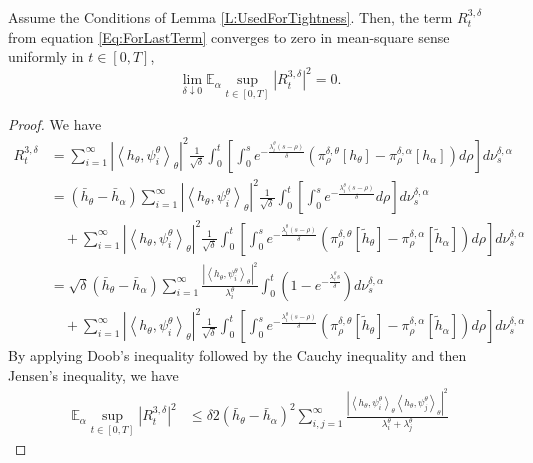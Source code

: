\documentclass{article}
\begin{document}
\begin{lemma}
\label{L:R3convergence}
Assume the Conditions of Lemma \ref{L:UsedForTightness}.
Then, the term $R^{3,\delta}_t$ from equation \eqref{Eq:ForLastTerm} converges to zero in mean-square sense uniformly in $t\in[0,T]$,
\[\lim_{\delta\downarrow 0}\mathbb{E}_{\alpha}\sup_{t\in[0,T]}\left|R^{3,\delta}_{t}\right|^{2}=0.\]
\end{lemma}
\begin{proof}
 We have
\begin{align}
R^{3,\delta}_{t}&=\sum_{i=1}^{\infty}\left|\left<h_{\theta},\psi_i^{\theta}\right>_{\theta}\right|^{2}\frac{1}{\sqrt\delta}\int_{0}^{t}\left[\int_0^s e^{-\frac{\lambda_i^{\theta}(s-\rho)}{\delta}}\left(\pi_\rho^{\delta,\theta}[h_{\theta}]-\pi_\rho^{\delta,\alpha}[h_{\alpha}]\right)d\rho\right]d\nu_s^{\delta,\alpha}\nonumber\\
&=(\bar{h}_{\theta}-\bar{h}_{\alpha})\sum_{i=1}^{\infty}\left|\left<h_{\theta},\psi_i^{\theta}\right>_{\theta}\right|^{2}\frac{1}{\sqrt\delta}\int_{0}^{t}\left[\int_0^s e^{-\frac{\lambda_i^{\theta}(s-\rho)}{\delta}}d\rho\right]d\nu_s^{\delta,\alpha}\nonumber\\
&\quad+\sum_{i=1}^{\infty}\left|\left<h_{\theta},\psi_i^{\theta}\right>_{\theta}\right|^{2}\frac{1}{\sqrt\delta}\int_{0}^{t}\left[\int_0^s e^{-\frac{\lambda_i^{\theta}(s-\rho)}{\delta}}\left(\pi_\rho^{\delta,\theta}[\tilde h_{\theta}]-\pi_\rho^{\delta,\alpha}[\tilde h_{\alpha}]\right)d\rho\right]d\nu_s^{\delta,\alpha}\nonumber\\
&=\sqrt{\delta}(\bar{h}_{\theta}-\bar{h}_{\alpha})\sum_{i=1}^{\infty}\frac{\left|\left<h_{\theta},\psi_i^{\theta}\right>_{\theta}\right|^{2}}{\lambda_i^{\theta}}\int_{0}^{t}\left(1- e^{-\frac{\lambda_i^{\theta}s}{\delta}}\right)d\nu_s^{\delta,\alpha}\nonumber\\
&\quad+\sum_{i=1}^{\infty}\left|\left<h_{\theta},\psi_i^{\theta}\right>_{\theta}\right|^{2}\frac{1}{\sqrt\delta}\int_{0}^{t}\left[\int_0^s e^{-\frac{\lambda_i^{\theta}(s-\rho)}{\delta}}\left(\pi_\rho^{\delta,\theta}[\tilde h_{\theta}]-\pi_\rho^{\delta,\alpha}[\tilde h_{\alpha}]\right)d\rho\right]d\nu_s^{\delta,\alpha}
\end{align}
By  applying Doob's inequality followed by the Cauchy inequality and then Jensen's inequality,  we have
\begin{align}
\mathbb{E}_{\alpha}\sup_{t\in[0,T]}\left|R^{3,\delta}_{t}\right|^{2}
&\leq \delta 2(\bar{h}_{\theta}-\bar{h}_{\alpha})^{2}\sum_{i,j=1}^{\infty}\frac{\left|\left<h_{\theta},\psi_i^{\theta}\right>_{\theta}\left<h_{\theta},\psi_j^{\theta}\right>_{\theta}\right|^{2}}{\lambda_i^{\theta}+\lambda_j^{\theta}}

\end{align}
\end{proof}
\end{document}
